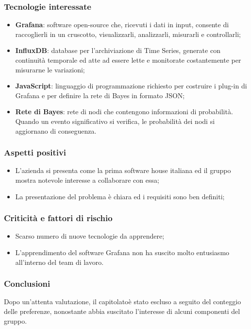 \subsubsection{Tecnologie interessate}
\begin{itemize}
	\item \textbf{Grafana}: software open-source\glo{} che, ricevuti i dati in 
input,
	 consente di raccoglierli in un cruscotto, visualizzarli, analizzarli, 
	 misurarli e controllarli;
	\item \textbf{InfluxDB}: database per l'archiviazione di Time Series\glo{}, generate con 
continuità
	 temporale ed atte ad essere lette e monitorate costantemente per misurarne 
	 le variazioni;
	\item \textbf{JavaScript}: linguaggio di programmazione richiesto per costruire i plug-in\glo{} di Grafana e per definire la rete di Bayes\glo{} in formato JSON\glo;
	\item \textbf{Rete di Bayes}: rete di nodi che contengono informazioni di 
probabilità. Quando un evento significativo si verifica, le probabilità dei nodi si aggiornano di conseguenza.
\end{itemize}
\subsubsection{Aspetti positivi}
\begin{itemize}
	\item L'azienda si presenta come la prima software house italiana ed il gruppo 
mostra 
	notevole interesse a collaborare con essa;
	\item La presentazione del problema è chiara ed i requisiti sono ben definiti;
\end{itemize}
\subsubsection{Criticità e fattori di rischio}
\begin{itemize}
	\item Scarso numero di nuove tecnologie da apprendere;
	\item L'apprendimento del software Grafana non ha suscito molto 
	entusiasmo all'interno del team di lavoro.
\end{itemize}
\subsubsection{Conclusioni}
Dopo un'attenta valutazione, il capitolato\glosp è stato escluso a seguito del conteggio delle preferenze, nonostante abbia suscitato l'interesse di alcuni componenti del gruppo.


